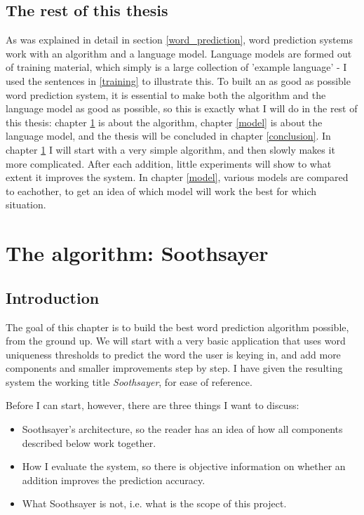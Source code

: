 \documentclass[12pt]{article}
\let\stdsection\section
\renewcommand\section{\newpage\stdsection}
\begin{document}
\subsection{The rest of this thesis} \label{restofthisthesis}
As was explained in detail in section \ref{word_prediction}, word prediction systems work with an algorithm and a language model. Language models are formed out of training material, which simply is a large collection of 'example language' - I used the sentences in \ref{training} to illustrate this. To built an as good as possible word prediction system, it is essential to make both the algorithm and the language model as good as possible, so this is exactly what I will do in the rest of this thesis: chapter \ref{algorithm} is about the algorithm, chapter \ref{model} is about the language model, and the thesis will be concluded in chapter \ref{conclusion}. In chapter \ref{algorithm} I will start with a very simple algorithm, and then slowly makes it more complicated. After each addition, little experiments will show to what extent it improves the system. In chapter \ref{model}, various models are compared to eachother, to get an idea of which model will work the best for which situation. 





\section{The algorithm: Soothsayer} \label{algorithm}

\subsection{Introduction}

The goal of this chapter is to build the best word prediction algorithm possible, from the ground up. We will start with a very basic application that uses word uniqueness thresholds to predict the word the user is keying in, and add more components and smaller improvements step by step. I have given the resulting system the working title \emph{Soothsayer}, for ease of reference. 

Before I can start, however, there are three things I want to discuss: 

\begin{itemize}
\item Soothsayer's architecture, so the reader has an idea of how all components described below work together.
\item How I evaluate the system, so there is objective information on whether an addition improves the prediction accuracy.
\item What Soothsayer is not, i.e. what is the scope of this project.
\end{itemize}
\end{document}
